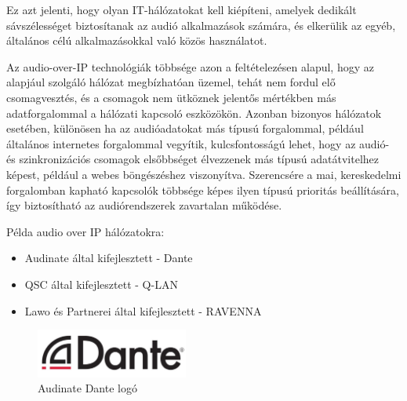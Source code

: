 Ez azt jelenti, hogy olyan IT-hálózatokat kell kiépíteni, amelyek dedikált sávszélességet 
biztosítanak az audió alkalmazások számára, és elkerülik az egyéb, általános célú alkalmazásokkal való közös használatot.


Az audio-over-IP technológiák többsége azon a feltételezésen alapul, hogy az alapjául szolgáló hálózat megbízhatóan üzemel, 
tehát nem fordul elő csomagvesztés, és a csomagok nem ütköznek jelentős mértékben más adatforgalommal a hálózati kapcsoló eszközökön. 
Azonban bizonyos hálózatok esetében, különösen ha az audióadatokat más típusú forgalommal, például általános 
internetes forgalommal vegyítik, kulcsfontosságú lehet, hogy az audió- és szinkronizációs csomagok elsőbbséget 
élvezzenek más típusú adatátvitelhez képest, például a webes böngészéshez viszonyítva. Szerencsére a mai, kereskedelmi 
forgalomban kapható kapcsolók többsége képes ilyen típusú prioritás beállítására, így biztosítható az audiórendszerek zavartalan működése. \newline

Példa audio over IP hálózatokra:
\begin{itemize}
	\item Audinate által kifejlesztett - Dante
\end{itemize}
\begin{itemize}
	\item QSC által kifejlesztett - Q-LAN
\end{itemize}
\begin{itemize}
	\item Lawo és Partnerei által kifejlesztett - RAVENNA
\end{itemize}
\begin{figure}[H]
	\centering
	\includegraphics[width=50mm, keepaspectratio]{figures/dante_logo.jpg}
	\caption{Audinate Dante logó}
	\label {fig:dante_logo}
\end{figure}
